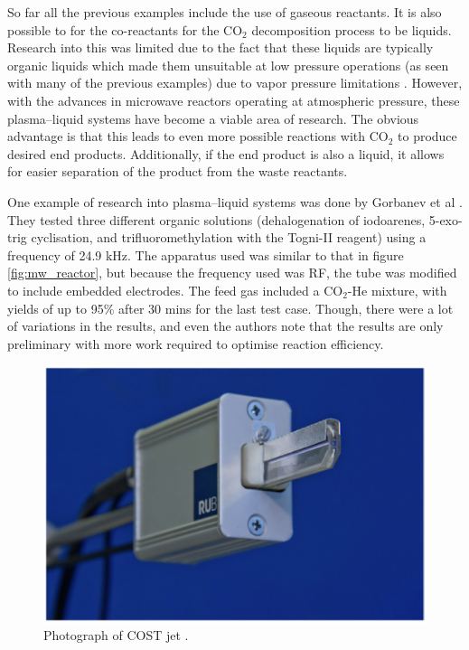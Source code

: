 
So far all the previous examples include the use of gaseous reactants. It is also possible to for the co-reactants for the CO$_2$ decomposition process to be liquids. Research into this was limited due to the fact that these liquids are typically organic liquids which made them unsuitable at low pressure operations (as seen with many of the previous examples) due to vapor pressure limitations \cite{Bruggeman2016}. However, with the advances in microwave reactors operating at atmospheric pressure, these plasma–liquid systems have become a viable area of research. The obvious advantage is that this leads to even more possible reactions with CO$_2$ to produce desired end products. Additionally, if the end product is also a liquid, it allows for easier separation of the product from the waste reactants. 

One example of research into plasma–liquid systems was done by Gorbanev et al \cite{Gorbanev2017}. They tested three different organic solutions (dehalogenation of iodoarenes, 5-exo-trig cyclisation, and trifluoromethylation with the Togni-II reagent) using a frequency of 24.9 kHz. The apparatus used was similar to that in figure \ref{fig:mw_reactor}, but because the frequency used was RF, the tube was modified to include embedded electrodes. The feed gas included a CO$_2$-He mixture, with yields of up to 95\% after 30 mins for the last test case. Though, there were a lot of variations in the results, and even the authors note that the results are only preliminary with more work required to optimise reaction efficiency.

\begin{figure}[h!]
	\centering
	\includegraphics[width=0.75\linewidth]{chapter_3/figures/COST_jet.png}
	\caption{Photograph of COST jet \cite{Golda2016}.}
	\label{fig:COST_jet}
\end{figure}

